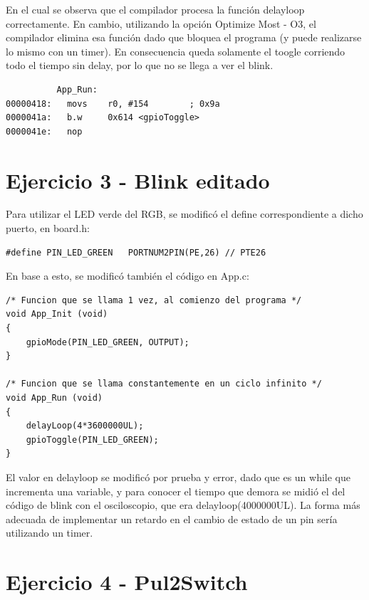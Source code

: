 \documentclass{article}
\begin{document}
En el cual se observa que el compilador procesa la función delayloop correctamente. En cambio, utilizando la opción Optimize Most - O3, el compilador elimina esa función dado que bloquea el programa (y puede realizarse lo mismo con un timer). En consecuencia queda solamente el toogle corriendo todo el tiempo sin delay, por lo que no se llega a ver el blink.

\begin{lstlisting}
          App_Run:
00000418:   movs    r0, #154        ; 0x9a
0000041a:   b.w     0x614 <gpioToggle>
0000041e:   nop     
\end{lstlisting}

\newpage

\section*{Ejercicio 3 - Blink editado}

Para utilizar el LED verde del RGB, se modificó el define correspondiente a dicho puerto, en board.h:

\begin{lstlisting}
#define PIN_LED_GREEN   PORTNUM2PIN(PE,26) // PTE26
\end{lstlisting}

En base a esto, se modificó también el código en App.c:

\begin{lstlisting}
/* Funcion que se llama 1 vez, al comienzo del programa */
void App_Init (void)
{
    gpioMode(PIN_LED_GREEN, OUTPUT);
}

/* Funcion que se llama constantemente en un ciclo infinito */
void App_Run (void)
{
    delayLoop(4*3600000UL);
    gpioToggle(PIN_LED_GREEN);
}
\end{lstlisting}

El valor en delayloop se modificó por prueba y error, dado que es un while que incrementa una variable, y para conocer el tiempo que demora se midió el del código de blink con el osciloscopio, que era delayloop(4000000UL). La forma más adecuada de implementar un retardo en el cambio de estado de un pin sería utilizando un timer.

\newpage

\section*{Ejercicio 4 - Pul2Switch}
\end{document}
